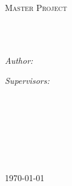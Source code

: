 \documentclass[
11pt, %
english, %
singlespacing, %
liststotoc, %
headsepline, %
]{MastersDoctoralThesis} %
\author{Benoît \textsc{Richard}} %
\begin{document}
\frontmatter %

\pagestyle{plain} %


\begin{titlepage}
\begin{center}

\vspace*{.06\textheight}
{\scshape\LARGE \univname\par}\vspace{1.5cm} %
\textsc{\Large Master Project}\\[0.5cm] %

\HRule \\[0.4cm] %
{\huge \bfseries \ttitle\par}\vspace{0.4cm} %
\HRule \\[1.5cm] %
 
\begin{minipage}[t]{0.4\textwidth}
\begin{flushleft} \large
\emph{Author:}\\
\authorname
\end{flushleft}
\end{minipage}
\begin{minipage}[t]{0.4\textwidth}
\begin{flushright} \large
\emph{Supervisors:} \\
\supname
\end{flushright}
\end{minipage}\\[3cm]
 
\vfill

\large \textit{}\\[0.3cm] %
\textit{}\\[0.4cm]
\groupname\\\deptname\\[2cm] %
 
\vfill

{\large \today}\\[4cm] %
 
\vfill
\end{center}
\end{titlepage}
\end{document}
